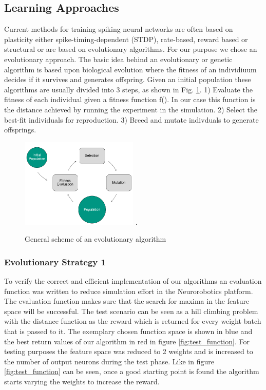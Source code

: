 \subsection{Learning Approaches}
Current methods for training spiking neural networks are often based on plasticity either spike-timing-dependent (STDP), rate-based, reward based or structural or are based on evolutionary algorithms. %
 For our purpose we chose an evolutionary approach. The basic idea behind an evolutionary or genetic algorithm is based upon biological evolution where the fitness of an individiuum decides if it survives and generates offspring. Given an initial population these algorithms are usually divided into 3 steps, as shown in Fig. \ref{evo_base}. 1) Evaluate the fitness of each individual given a fitness function f(). In our case this function is the distance achieved by running the experiment in the simulation. 2) Select the best-fit individuals for reproduction. 3) Breed and mutate indivduals to generate offsprings.

\begin{figure}[H]
	\centering
	\includegraphics[width=2.2in]{img/evo_base.png}
	\DeclareGraphicsExtensions.
	\caption{General scheme of an evolutionary algorithm}
	\label{evo_base}
\end{figure}

\subsubsection{Evolutionary Strategy 1}


To verify the correct and efficient implementation of our algorithms an evaluation function was written to reduce simulation effort in the Neurorobotics platform. The evaluation function makes sure that the search for maxima in the feature space will be successful. The test scenario can be seen as a hill climbing problem with the distance function as the reward which is returned for every weight batch that is passed to it. The exemplary chosen function space is shown in blue and the best return values of our algorithm in red in figure \ref{fig:test_function}. For testing purposes the feature space was reduced to 2 weights and is increased to the number of output neurons during the test phase.
Like in figure \ref{fig:test_function} can be seen, once a good starting point is found the algorithm starts varying the weights to increase the reward. 

